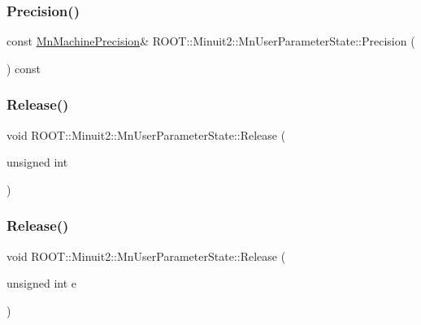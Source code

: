 \subsubsection{\texorpdfstring{Precision()}{Precision()}\hspace{0.1cm}{\footnotesize\ttfamily [2/2]}}
{\footnotesize\ttfamily const \mbox{\hyperlink{classROOT_1_1Minuit2_1_1MnMachinePrecision}{Mn\+Machine\+Precision}}\& R\+O\+O\+T\+::\+Minuit2\+::\+Mn\+User\+Parameter\+State\+::\+Precision (\begin{DoxyParamCaption}{ }\end{DoxyParamCaption}) const}

\mbox{\label{classROOT_1_1Minuit2_1_1MnUserParameterState_a7dd23afe69aaab961b536e2cdc75d66e}} 
\subsubsection{\texorpdfstring{Release()}{Release()}\hspace{0.1cm}{\footnotesize\ttfamily [1/4]}}
{\footnotesize\ttfamily void R\+O\+O\+T\+::\+Minuit2\+::\+Mn\+User\+Parameter\+State\+::\+Release (\begin{DoxyParamCaption}\item[{unsigned int}]{ }\end{DoxyParamCaption})}

\mbox{\label{classROOT_1_1Minuit2_1_1MnUserParameterState_a7dd23afe69aaab961b536e2cdc75d66e}} 
\subsubsection{\texorpdfstring{Release()}{Release()}\hspace{0.1cm}{\footnotesize\ttfamily [2/4]}}
{\footnotesize\ttfamily void R\+O\+O\+T\+::\+Minuit2\+::\+Mn\+User\+Parameter\+State\+::\+Release (\begin{DoxyParamCaption}\item[{unsigned int}]{e }\end{DoxyParamCaption})}

